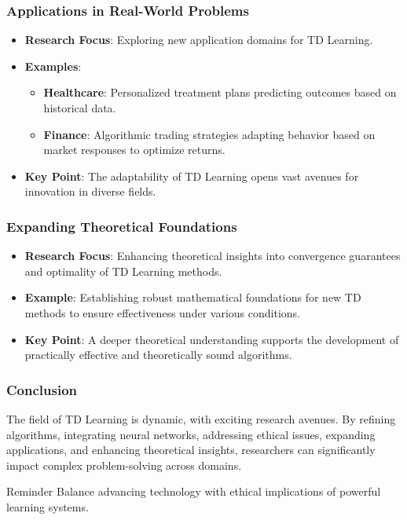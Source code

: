 \documentclass[aspectratio=169]{beamer}
\begin{document}
\begin{frame}[fragile]
    \frametitle{Applications in Real-World Problems}
    
    \begin{itemize}
        \item \textbf{Research Focus}: Exploring new application domains for TD Learning.
        \item \textbf{Examples}:
            \begin{itemize}
                \item \textbf{Healthcare}: Personalized treatment plans predicting outcomes based on historical data.
                \item \textbf{Finance}: Algorithmic trading strategies adapting behavior based on market responses to optimize returns.
            \end{itemize}
        \item \textbf{Key Point}: The adaptability of TD Learning opens vast avenues for innovation in diverse fields.
    \end{itemize}
\end{frame}

\begin{frame}[fragile]
    \frametitle{Expanding Theoretical Foundations}
    
    \begin{itemize}
        \item \textbf{Research Focus}: Enhancing theoretical insights into convergence guarantees and optimality of TD Learning methods.
        \item \textbf{Example}: Establishing robust mathematical foundations for new TD methods to ensure effectiveness under various conditions.
        \item \textbf{Key Point}: A deeper theoretical understanding supports the development of practically effective and theoretically sound algorithms.
    \end{itemize}
\end{frame}

\begin{frame}[fragile]
    \frametitle{Conclusion}
    
    The field of TD Learning is dynamic, with exciting research avenues. By refining algorithms, integrating neural networks, addressing ethical issues, expanding applications, and enhancing theoretical insights, researchers can significantly impact complex problem-solving across domains.
    
    \begin{block}{Reminder}
        Balance advancing technology with ethical implications of powerful learning systems.
    \end{block}
\end{frame}
\end{document}
